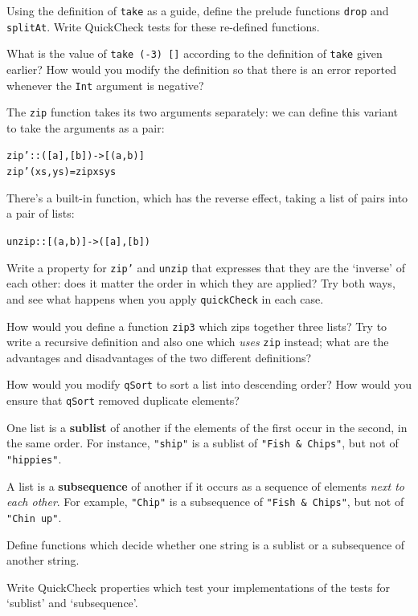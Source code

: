 \begin{exercises}
\item 
Using the definition of \texttt{take} as a guide,
define the prelude functions \texttt{drop} and \texttt{splitAt}. Write QuickCheck tests for these re-defined functions.

\item
What is the value of \texttt{take (-3) []} according to the definition
of \texttt{take} given earlier? How would you modify the definition so
that there is an error reported whenever the \texttt{Int} argument is
negative?


\item
The \texttt{zip} function takes its two arguments separately: we can define this variant to take the arguments as a pair:
\begin{alltt}
zip' :: ([a],[b]) -> [(a,b)]
zip' (xs,ys) = zip xs ys
\end{alltt}
There's a built-in function, which has the reverse effect, taking a list of pairs into a pair of lists:
\begin{alltt}
unzip :: [(a,b)] -> ([a],[b])
\end{alltt}
Write a property for \texttt{zip'} and \texttt{unzip} that expresses that they are the `inverse' of each other: does it matter the order in which they are applied? Try both ways, and see what happens when you apply \texttt{quickCheck} in each case.
 
\item
How would you define a function \texttt{zip3} which zips together three
lists? Try to write a recursive definition and also one which {\em
uses\/} \texttt{zip} instead; what are the advantages and disadvantages
of the two different definitions?

\item
How would you modify \texttt{qSort} to sort a list into descending order?
How would you ensure that \texttt{qSort} removed duplicate elements?

\item
One list is a \textbf{sublist} of another if the elements of the first occur in the
second, in the same order. For instance, \texttt{"ship"} is a sublist
of \texttt{"Fish \& Chips"}, but not of \texttt{"hippies"}.

A list is a \textbf{subsequence} of another if it occurs as a sequence
of elements {\em next to each other}. For example, \texttt{"Chip"} is a
subsequence
of \texttt{"Fish \& Chips"}, but not of \texttt{"Chin up"}.

Define functions which decide whether one string is a sublist or a
subsequence of another string.

\item
Write QuickCheck properties which test your implementations of the tests for `sublist' and `subsequence'.

\end{exercises}

